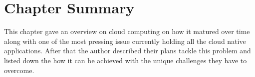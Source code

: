 \section{Chapter Summary}

This chapter gave an overview on cloud computing on how it matured over time along with one of the most pressing issue currently holding all the cloud native applications. After that the author described their plans tackle this problem and listed down the how it can be achieved with the unique challenges they have to overcome.

